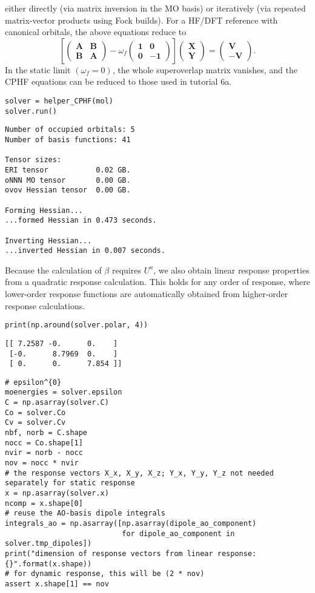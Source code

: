either directly (via matrix inversion in the MO basis) or iteratively (via repeated matrix-vector products using Fock builds). For a HF/DFT reference with canonical orbitals, the above equations reduce to
\[
  \left[
    \begin{pmatrix}
      \mathbf{A} & \mathbf{B} \\
      \mathbf{B} & \mathbf{A}
    \end{pmatrix}
    - \omega_{f}
    \begin{pmatrix}
      \mathbf{1} & \mathbf{0} \\
      \mathbf{0} & -\mathbf{1}
    \end{pmatrix}
  \right]
  \begin{pmatrix}
    \mathbf{X} \\
    \mathbf{Y}
  \end{pmatrix}
  =
  \begin{pmatrix}
    \mathbf{V} \\
    -\mathbf{V}
  \end{pmatrix}
  .
\]
In the static limit \((\omega_f = 0)\), the whole superoverlap matrix vanishes, and the CPHF equations can be reduced to those used in tutorial 6a.
\begin{verbatim}
solver = helper_CPHF(mol)
solver.run()
\end{verbatim}
\begin{verbatim}
Number of occupied orbitals: 5
Number of basis functions: 41

Tensor sizes:
ERI tensor           0.02 GB.
oNNN MO tensor       0.00 GB.
ovov Hessian tensor  0.00 GB.

Forming Hessian...
...formed Hessian in 0.473 seconds.

Inverting Hessian...
...inverted Hessian in 0.007 seconds.
\end{verbatim}
Because the calculation of \(\beta\) requires \(U^{a}\), we also obtain linear response properties from a quadratic response calculation. This holds for any order of response, where lower-order response functions are automatically obtained from higher-order response calculations.
\begin{verbatim}
print(np.around(solver.polar, 4))
\end{verbatim}
\begin{verbatim}
[[ 7.2587 -0.      0.    ]
 [-0.      8.7969  0.    ]
 [ 0.      0.      7.854 ]]
\end{verbatim}
\begin{verbatim}
# epsilon^{0}
moenergies = solver.epsilon
C = np.asarray(solver.C)
Co = solver.Co
Cv = solver.Cv
nbf, norb = C.shape
nocc = Co.shape[1]
nvir = norb - nocc
nov = nocc * nvir
# the response vectors X_x, X_y, X_z; Y_x, Y_y, Y_z not needed separately for static response
x = np.asarray(solver.x)
ncomp = x.shape[0]
# reuse the AO-basis dipole integrals
integrals_ao = np.asarray([np.asarray(dipole_ao_component)
                           for dipole_ao_component in solver.tmp_dipoles])
print("dimension of response vectors from linear response: {}".format(x.shape))
# for dynamic response, this will be (2 * nov)
assert x.shape[1] == nov
\end{verbatim}
